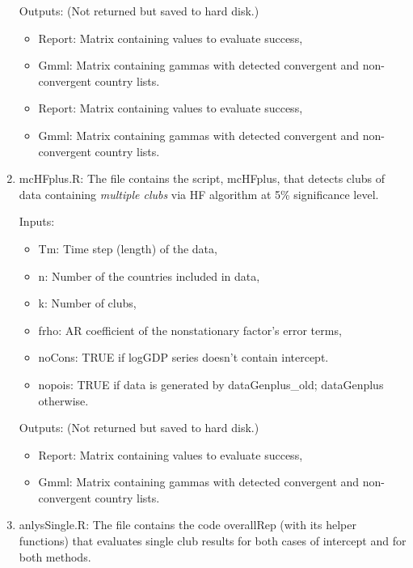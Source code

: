 \documentclass{article}
\begin{document}
\begin{enumerate}
		Outputs: (Not returned but saved to hard disk.)
		
		\begin{itemize}
			\item Report: Matrix containing values to evaluate success,
			\item Gmml: Matrix containing gammas with detected convergent and non-convergent country lists.
		\end{itemize}		 	
	\begin{itemize}
		\item Report: Matrix containing values to evaluate success,
		\item Gmml: Matrix containing gammas with detected convergent and non-convergent country lists.
	\end{itemize}		 	
	
	\item mcHFplus.R: The file contains the script, mcHFplus, that detects clubs of data containing \textit{multiple clubs} via HF algorithm at 5\% significance level.
	
	Inputs:
	\begin{itemize}
		
		\item Tm: Time step (length) of the data,
		\item n: Number of the countries included in data,
		\item k: Number of clubs, 
		\item frho: AR coefficient of the nonstationary factor's error terms,
		\item noCons: TRUE if logGDP series doesn't contain intercept.
		\item nopois: TRUE if data is generated by dataGenplus\_old; dataGenplus otherwise.
	\end{itemize}
	
	Outputs: (Not returned but saved to hard disk.)
	
	\begin{itemize}
		\item Report: Matrix containing values to evaluate success,
		\item Gmml: Matrix containing gammas with detected convergent and non-convergent country lists.
	\end{itemize}		 	
	
	\item anlysSingle.R: The file contains the code overallRep (with its helper functions) that evaluates single club results for both cases of intercept and for both methods.
	

\end{enumerate}
\end{document}
